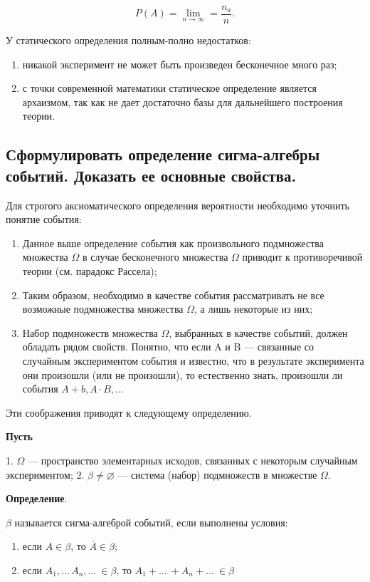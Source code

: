 \begin{equation}
	P(A) = \lim\limits_{n \rightarrow \infty} = \frac{n_a}{n}.
\end{equation}

У статического определения полным-полно недостатков:

\begin{enumerate}
	\item никакой эксперимент не может быть произведен бесконечное много раз;
	\item с точки современной математики статическое определение является архаизмом, так как не дает достаточно базы для дальнейшего построения теории.
\end{enumerate}

\subsection{Сформулировать определение сигма-алгебры событий. Доказать ее основные свойства.}

Для строгого аксиоматического определения вероятности необходимо уточнить понятие события:

\begin{enumerate}
	\item Данное выше определение события как произвольного подмножества множества $\Omega$ в случае бесконечного множества $\Omega$ приводит к противоречивой теории (см. парадокс Рассела);
	\item Таким образом, необходимо в качестве события рассматривать не все возможные подмножества множества $\Omega$, а лишь некоторые из них; 
	\item Набор подмножеств множества $\Omega$, выбранных в качестве событий, должен обладать рядом свойств. Понятно, что если A и B --- связанные со случайным экспериментом события и известно, что в результате эксперимента они произошли (или не произошли), то естественно знать, произошли ли события $A + b, A \cdot B, \dots$
\end{enumerate}

Эти соображения приводят к следующему определению.

\textbf{Пусть} 

1. $\Omega$ --- пространство элементарных исходов, связанных с некоторым случайным экспериментом; 
2. $\beta \neq \varnothing$ --- система (набор) подмножеств в множестве $\Omega$.

\textbf{Определение}. 

$\beta$ называется сигма-алгеброй событий, если выполнены условия: 
\begin{enumerate}
	\item если $A \in \beta$, то $\overline{A} \in \beta$;
	\item если $A_1, \dots\, A_n, \dots\ \in \beta$, то $A_1 + \dots\ + A_n + \dots\ \in \beta$
\end{enumerate}


